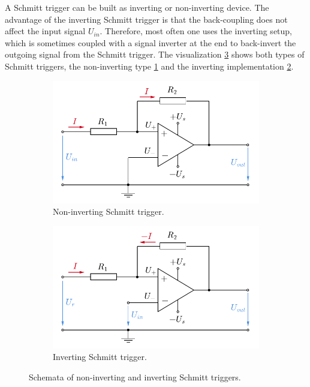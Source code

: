 \documentclass{report}
\numberwithin{tm}{section}
\begin{document}
A Schmitt trigger can be built as inverting or non-inverting device. The advantage of the inverting Schmitt trigger is that the back-coupling does not affect the input signal $U_{in}$. Therefore, most often one uses the inverting setup, which is sometimes coupled with a signal inverter at the end to back-invert the outgoing signal from the Schmitt trigger. The visualization \cref{fig:schmitt_trigger} shows both types of Schmitt triggers, the non-inverting type \cref{fig:noninverting_schmitt_trigger} and the inverting implementation \cref{fig:inverting_schmitt_trigger}.
\begin{figure}[h]
	\centering
	\begin{subfigure}{0.49\textwidth}
		\centering
		\includegraphics[width=\textwidth]{figures/noninverting_schmitt_trigger.pdf}
		\caption{Non-inverting Schmitt trigger.}
		\label{fig:noninverting_schmitt_trigger}
	\end{subfigure}
	\hfill
	\begin{subfigure}{0.49\textwidth}
		\centering
		\includegraphics[width=\textwidth]{figures/inverting_schmitt_trigger.pdf}
		\caption{Inverting Schmitt trigger.}
		\label{fig:inverting_schmitt_trigger}
	\end{subfigure}
	\caption{Schemata of non-inverting and inverting Schmitt triggers.}
	\label{fig:schmitt_trigger}
\end{figure}
\end{document}
